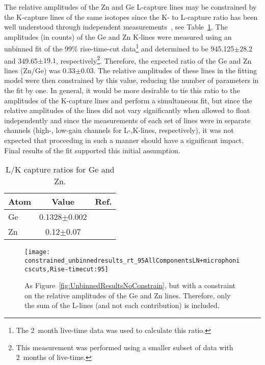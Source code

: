 The relative amplitudes of the Zn and Ge L-capture lines may be constrained by the K-capture lines of the same isotopes since the K- to L-capture ratio has been well understood through independent measurements~\cite{Bea67,Ocampo1962}, see Table~\ref{tab:LKRatios}.  The amplitudes (in counts) of the Ge and Zn K-lines were measured using an unbinned fit of the 99\% rise-time-cut data\footnote{The 2~month live-time data was used to calculate this ratio.} and determined to be 945.125$\pm28.2$ and 349.65$\pm19.1$, respectively\footnote{This measurement was performed using a smaller subset of data with 2~months of live-time.}.  Therefore, the expected ratio of the Ge and Zn lines (Zn/Ge) was 0.33$\pm$0.03.  The relative amplitudes of these lines in the fitting model were then constrained by this value, reducing the number of parameters in the fit by one.  In general, it would be more desirable to tie this ratio to the amplitudes of the K-capture lines and perform a simultaneous fit, but since the relative amplitudes of the lines did not vary significantly when allowed to float independently and since the measurements of each set of lines were in separate channels (high-, low-gain channels for L-,K-lines, respectively), it was not expected that proceeding in such a manner should have a significant impact.  Final results of the fit supported this initial assumption.
	
			\begin{table}
				\centering
				\begin{tabular}{lcr}
					\toprule
					Atom & Value & Ref.\\
					\midrule
					Ge & 0.1328$\pm$0.002 & \cite{Bea67}\\
					Zn & 0.12$\pm$0.07 & \cite{Ocampo1962}\\
					\bottomrule
				\end{tabular}	
				\caption[L/K capture ratios for Ge and Zn]
				{L/K capture ratios for Ge and Zn.}
				\label{tab:LKRatios}
			\end{table}
			
			\begin{figure}
				\centering				
				\texttt{[image: constrained\_unbinnedresults\_rt\_95AllComponentsLN+microphonicscuts,Rise-timecut:95]}				
				\caption[Results from an unbinned fit, constraints on relative amplitude of Ge and Zn lines]
				{As Figure~\ref{fig:UnbinnedResultsNoConstrain}, but with a constraint on the relative amplitudes 
				of the Ge and Zn lines.  Therefore, only the sum of the L-lines (and not each contribution) is included.  }
				\label{fig:UnBinnedResultsConstrain}
			\end{figure}
					
